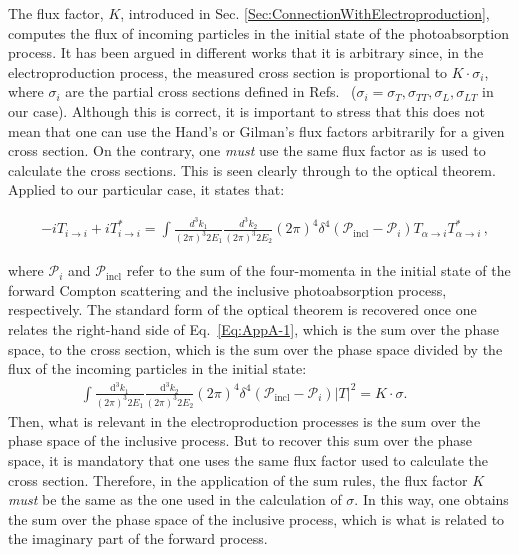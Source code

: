 \documentclass[twocolumn,prc,showpacs,nofootinbib,preprintnumbers,amsmath,amssymb,superscriptaddress]{revtex4-1}
\def\dd{\mathrm{d}}
\begin{document}
The flux factor, $K$, introduced in Sec. \ref{Sec:ConnectionWithElectroproduction}, computes the flux of incoming particles in the initial state of the photoabsorption process. 
It has been argued in different works that it is arbitrary since, in the electroproduction process, the measured cross section is proportional to $K\cdot \sigma_i$, where $\sigma_i$ are the partial cross sections defined in Refs.~\cite{Drechsel:2000ct, Drechsel:2002ar} ($\sigma_i=\sigma_T,\sigma_{TT},\sigma_L,\sigma_{LT}$ in our case). 
Although this is correct, it is important to stress that this does not mean that one can use the Hand's \cite{Hand:1963bb}  or Gilman's \cite{Gilman:1967sn}  flux factors arbitrarily for a given cross section. On the contrary, one {\itshape must}  use the same flux factor as is used to calculate the cross sections.   
 This is seen clearly through to the optical theorem. Applied to our particular case, it states that:
\begin{widetext}
\begin{align}\label{Eq:AppA-1}
&- i T_{i\to i } + i T_{i\to i }^*= \int\!\!\!\! \frac{d^3 k_1 }{(2\pi)^3 2E_1} \frac{d^3 k_{2} }{(2\pi)^3 2E_{2}} (2\pi)^4 \delta^4 (\mathcal{P}_\mathrm{incl} - \mathcal{P}_i) T_{\alpha \to i}  T_{\alpha \to i}^* \,,
\end{align}
\end{widetext}
where $\mathcal{P}_{i}$ and $\mathcal{P}_\mathrm{incl}$ refer to the sum of the four-momenta in the initial state of the forward Compton scattering and the inclusive photoabsorption process, respectively.
The standard form of the optical theorem is recovered once one relates the right-hand side of Eq.~\eqref{Eq:AppA-1}, which is the sum over the phase space, to the cross section, which is the sum over the phase space divided by the flux of the incoming particles in the initial state:
\begin{align}\label{Eq:AppA-2}
 \int\!\!\!\! \frac{\dd^3 k_1 }{(2\pi)^3 2E_1} \frac{\dd^3 k_{2} }{(2\pi)^3 2E_{2}} (2\pi)^4 \delta^4 (\mathcal{P}_\mathrm{incl} - \mathcal{P}_i) |T|^2 = K\cdot \sigma. \qquad\;
\end{align}
Then, what is relevant in the electroproduction processes is the sum over the phase space of the inclusive process.
But to recover this sum over the phase space, it is mandatory that one uses the same flux factor used to calculate the cross section. 
Therefore, in the application of the sum rules, the flux factor $K$ {\itshape must} be the same as the one used in the calculation of $\sigma$.
In this way, one obtains the sum over the phase space of the inclusive process, which is what is related to the imaginary part of the forward process.
\end{document}

